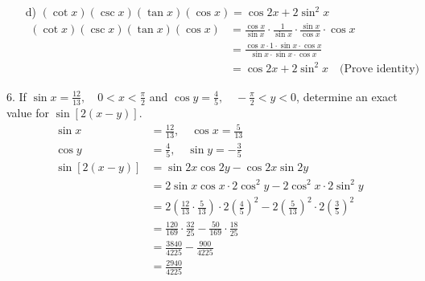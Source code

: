 \documentclass{article}
\newenvironment{solution}{\color{solutioncolor}}{}
\begin{document}
\begin{enumerate}
    \item[d)] $(\cot x)(\csc x)(\tan x)(\cos x) = \cos 2x + 2\sin^2x$
    \begin{solution}
        \begin{align*}
            (\cot x)(\csc x)(\tan x)(\cos x) &= \frac{\cos x}{\sin x} \cdot \frac{1}{\sin x} \cdot \frac{\sin x}{\cos x} \cdot \cos x \\
            &= \frac{\cos x \cdot 1 \cdot \sin x \cdot \cos x}{\sin x \cdot \sin x \cdot \cos x} \\
            &= \cos 2x + 2\sin^2x \quad \text{(Prove identity)}
        \end{align*}
    \end{solution}
\end{enumerate}

6. If $\sin x = \frac{12}{13}, \quad 0 < x < \frac{\pi}{2}$ and $\cos y = \frac{4}{5}, \quad -\frac{\pi}{2} < y < 0$, determine an exact value for $\sin[2(x-y)]$.
\begin{solution}
    \begin{align*}
        \sin x &= \frac{12}{13}, \quad \cos x = \frac{5}{13} \\
        \cos y &= \frac{4}{5}, \quad \sin y = -\frac{3}{5} \\
        \sin[2(x-y)] &= \sin 2x \cos 2y - \cos 2x \sin 2y \\
        &= 2\sin x \cos x \cdot 2\cos^2 y - 2\cos^2 x \cdot 2\sin^2 y \\
        &= 2 \left(\frac{12}{13} \cdot \frac{5}{13}\right) \cdot 2 \left(\frac{4}{5}\right)^2 - 2 \left(\frac{5}{13}\right)^2 \cdot 2 \left(\frac{3}{5}\right)^2 \\
        &= \frac{120}{169} \cdot \frac{32}{25} - \frac{50}{169} \cdot \frac{18}{25} \\
        &= \frac{3840}{4225} - \frac{900}{4225} \\
        &= \frac{2940}{4225}
    \end{align*}
\end{solution}
\end{document}
